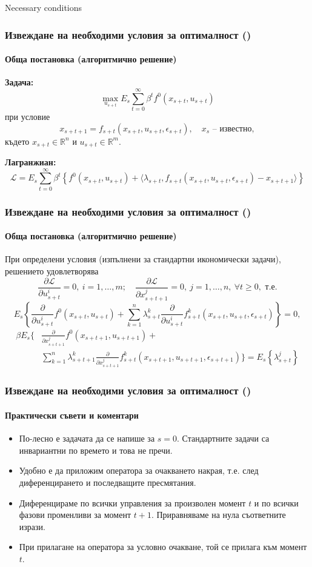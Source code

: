 \documentclass[10pt]{beamer}
\theoremstyle{definition}
\begin{document}
\begin{section}{Necessary conditions}\label{sec:NCs}
\setcounter{slidenum}{1}
\begin{frame}
\frametitle{Извеждане на необходими условия за оптималност
()}\framesubtitle{Обща постановка
(алгоритмично решение)} \textbf{Задача:}
$$\max_{u_{s+t}}E_s\sum_{t=0}^\infty \beta^t f^0(x_{s+t},u_{s+t})$$ при
условие
$$x_{s+t+1}=f_{s+t}(x_{s+t},u_{s+t},\epsilon_{s+t}),\quad x_s\textrm{ --
известно},$$ където $x_{s+t}\in \mathbb{R}^n$ и $u_{s+t}\in \mathbb{R}^m$.

\textbf{Лагранжиан:} $$\mathcal{L}=E_s\sum_{t=0}^\infty \beta^t
\left\{ f^0(x_{s+t},u_{s+t}) + \langle \lambda_{s+t},
f_{s+t}(x_{s+t},u_{s+t},\epsilon_{s+t})-x_{s+t+1} \rangle \right\}$$

\end{frame}


\begin{frame} \frametitle{Извеждане на
необходими условия за оптималност
()}\framesubtitle{Обща постановка
(алгоритмично решение)} При определени условия (изпълнени за
стандартни икономически задачи), решението удовлетворява
$$\frac{\partial \mathcal{L}}{\partial u_{s+t}^i}=0,~i=1,\ldots,m; \quad \frac{\partial \mathcal{L}}{\partial x_{s+t+1}^j}=0,~j=1,\ldots,n,~\forall t \geq 0,\textrm{ т.е.} $$
$$E_s
\left\{ \frac{\partial}{\partial u_{s+t}^i}f^0(x_{s+t},u_{s+t}) + \sum_{k=1}^n \lambda^k_{s+t}
\frac{\partial}{\partial u_{s+t}^i}f^k_{s+t}(x_{s+t},u_{s+t},\epsilon_{s+t}) \right\}=0,$$
\begin{equation*}
    \begin{split}
\beta E_s
\Biggl\{ & \frac{\partial}{\partial x_{s+t+1}^j} f^0(x_{s+t+1},u_{s+t+1}) + \\ &  \sum_{k=1}^n \lambda^k_{s+t+1}
\frac{\partial}{\partial x_{s+t+1}^j}f^k_{s+t}(x_{s+t+1},u_{s+t+1},\epsilon_{s+t+1}) \Biggr\} =  E_s
\left\{ \lambda_{s+t}^j \right\}
    \end{split}
\end{equation*}
\end{frame}



\begin{frame}
\frametitle{Извеждане на необходими условия за оптималност ()}
\framesubtitle{Практически съвети и коментари}
\begin{itemize}
\item По-лесно е задачата да се напише за $ s=0 $. Стандартните задачи са инвариантни по времето и това не пречи.
\item Удобно е да приложим оператора за очакването накрая, т.е. след диференцирането и последващите пресмятания.
\item Диференцираме по всички управления за произволен момент $ t $ и по всички фазови променливи за момент $ t+1 $. Приравняваме на нула съответните изрази.
\item При прилагане на оператора за условно очакване, той се прилага към момент $ t $.
\end{itemize}
\end{frame}




\end{section}
\end{document}
